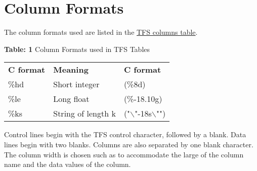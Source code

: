 
\section{Column Formats}

The column formats used are listed in the  \hyperlink{table}{TFS columns
  table}.   

\begin{center}
\begin{table}[H]
{\textbf{Table: 1} Column Formats used in TFS Tables}
\\
\begin{tabular}{l l l}
\textbf{C format} & \textbf{Meaning} & \textbf{C format} \\ 
\%hd & Short integer & (\%8d) \\ 
\%le & Long float & (\%-18.10g) \\ 
\%ks & String of length k & ("$\backslash$"-18s$\backslash$"")
\end{tabular}
\end{table}
\end{center}

Control lines begin with the TFS control character, followed by a
blank. Data lines begin with two blanks. Columns are also separated by
one blank character. The column width is chosen such as to accommodate
the large of the column name and the data values of the column.  

